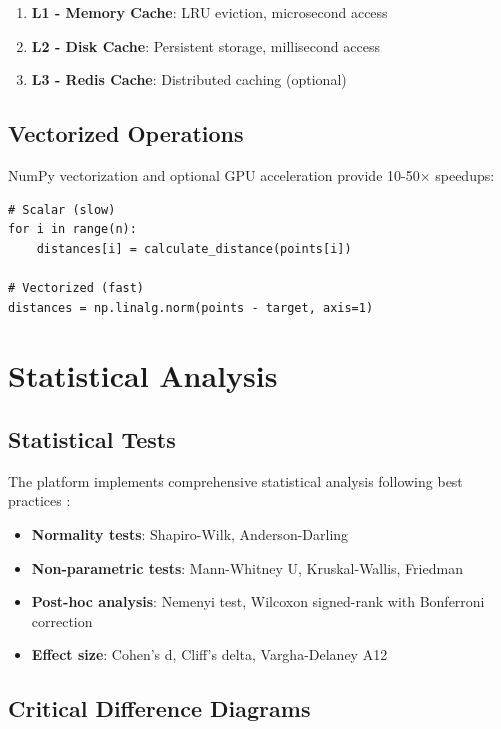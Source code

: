 \documentclass[conference]{IEEEtran}
\begin{document}
\begin{enumerate}
    \item \textbf{L1 - Memory Cache}: LRU eviction, microsecond access
    \item \textbf{L2 - Disk Cache}: Persistent storage, millisecond access
    \item \textbf{L3 - Redis Cache}: Distributed caching (optional)
\end{enumerate}

\subsection{Vectorized Operations}

NumPy vectorization and optional GPU acceleration provide 10-50× speedups:

\begin{lstlisting}[style=pythonstyle, caption={Vectorized vs scalar operations}]
# Scalar (slow)
for i in range(n):
    distances[i] = calculate_distance(points[i])

# Vectorized (fast)
distances = np.linalg.norm(points - target, axis=1)
\end{lstlisting}

\section{Statistical Analysis}
\label{sec:statistics}

\subsection{Statistical Tests}

The platform implements comprehensive statistical analysis following best practices \cite{garcia2010advanced}:

\begin{itemize}
    \item \textbf{Normality tests}: Shapiro-Wilk, Anderson-Darling
    \item \textbf{Non-parametric tests}: Mann-Whitney U, Kruskal-Wallis, Friedman
    \item \textbf{Post-hoc analysis}: Nemenyi test, Wilcoxon signed-rank with Bonferroni correction
    \item \textbf{Effect size}: Cohen's d, Cliff's delta, Vargha-Delaney A12
\end{itemize}

\subsection{Critical Difference Diagrams}
\end{document}
